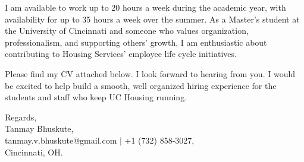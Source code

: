 \documentclass[11pt]{letter}
\begin{document}
\begin{letter}{}
I am available to work up to 20 hours a week during the academic year, with availability for up to 35 hours a week over the summer. As a Master's student at the University of Cincinnati and someone who values organization, professionalism, and supporting others' growth, I am enthusiastic about contributing to Housing Services' employee life cycle initiatives.

Please find my CV attached below. I look forward to hearing from you. I would be excited to help build a smooth, well organized hiring experience for the students and staff who keep UC Housing running.

{\setlength{\parskip}{0pt}
Regards,\\
Tanmay Bhuskute,\\
tanmay.v.bhuskute@gmail.com $\mid$ +1 (732) 858-3027,\\
Cincinnati, OH.
}

\end{letter}
\end{document}
